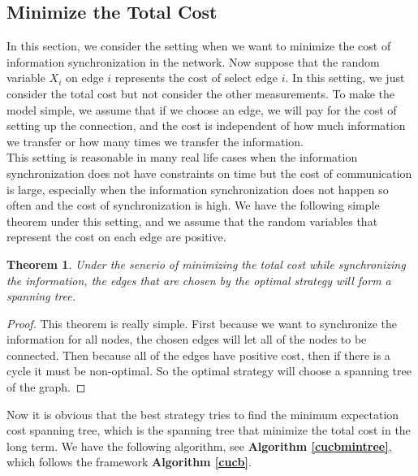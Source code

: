 \documentclass{article}
\theoremstyle{plain}
\newtheorem{thm}{Theorem}[section]
\theoremstyle{definition}
\theoremstyle{remark}
\begin{document}
    \subsection{Minimize the Total Cost}
    In this section, we consider the setting when we want to minimize the cost of information synchronization in the network. Now suppose that the random variable $X_i$ on edge $i$ represents the cost of select edge $i$. In this setting, we just consider the total cost but not consider the other measurements. To make the model simple, we assume that if we choose an edge, we will pay for the cost of setting up the connection, and the cost is independent of how much information we transfer or how many times we transfer the information.\\
    
    This setting is reasonable in many real life cases when the information synchronization does not have constraints on time but the cost of communication is large, especially when the information synchronization does not happen so often and the cost of synchronization is high. We have the following simple theorem under this setting, and we assume that the random variables that represent the cost on each edge are positive.\\

    \begin{thm}\label{min-spanning-tree}
        Under the senerio of minimizing the total cost while synchronizing the information, the edges that are chosen by the optimal strategy will form a spanning tree.
    \end{thm}
    \begin{proof}
        This theorem is really simple. First because we want to synchronize the information for all nodes, the chosen edges will let all of the nodes to be connected. Then because all of the edges have positive cost, then if there is a cycle it must be non-optimal. So the optimal strategy will choose a spanning tree of the graph.
    \end{proof}

    Now it is obvious that the best strategy tries to find the minimum expectation cost spanning tree, which is the spanning tree that minimize the total cost in the long term. We have the following algorithm, see \textbf{Algorithm \ref{cucbmintree}}, which follows the framework \textbf{Algorithm \ref{cucb}}.
\end{document}
